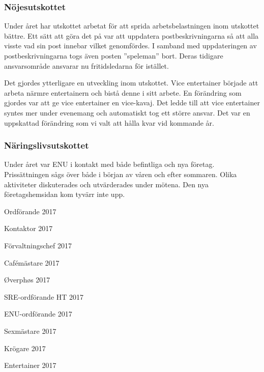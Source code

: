 \documentclass[../_main/handlingar.tex]{subfiles}
\begin{document}
\subsubsection*{Nöjesutskottet}
Under året har utskottet arbetat för att sprida arbetsbelastningen inom utskottet bättre. Ett sätt att göra det på var att uppdatera postbeskrivningarna så att alla visste vad sin post innebar vilket genomfördes. I samband med uppdateringen av postbeskrivningarna togs även posten ”speleman” bort. Deras tidigare ansvarsområde ansvarar nu fritidsledarna för istället.

Det gjordes ytterligare en utveckling inom utskottet. Vice entertainer började att arbeta närmre entertainern och bistå denne i sitt arbete. En förändring som gjordes var att ge vice entertainer en vice-kavaj. Det ledde till att vice entertainer syntes mer under evenemang och automatiskt tog ett större ansvar. Det var en uppskattad förändring som vi valt att hålla kvar vid kommande år.

\subsubsection*{Näringslivsutskottet}
Under året var ENU i kontakt med både befintliga och nya företag. Prissättningen sågs över både i början av våren och efter sommaren. Olika aktiviteter diskuterades och utvärderades under mötena. Den nya företagshemsidan kom tyvärr inte upp.

\newpage
\begin{signatures}{10}
    \mvh
    \signature{Erik Månsson}{Ordförande 2017}
    \signature{Johan Karlberg}{Kontaktor 2017}
    \signature{Sophia Grimmeiss Grahm}{Förvaltningschef 2017}
    \signature{Daniel Bakic}{Cafémästare 2017}
    \signature{Niklas Gustafson}{Øverphøs 2017}
    \signature{Edvard Carlsson}{SRE-ordförande HT 2017}
    \signature{Josefine Sandström}{ENU-ordförande 2017}
    \signature{Linnea Sjödahl}{Sexmästare 2017}
    \signature{Markus Rahne}{Krögare 2017}
    \signature{Albin Nyström Eklund}{Entertainer 2017}
\end{signatures}
\end{document}
